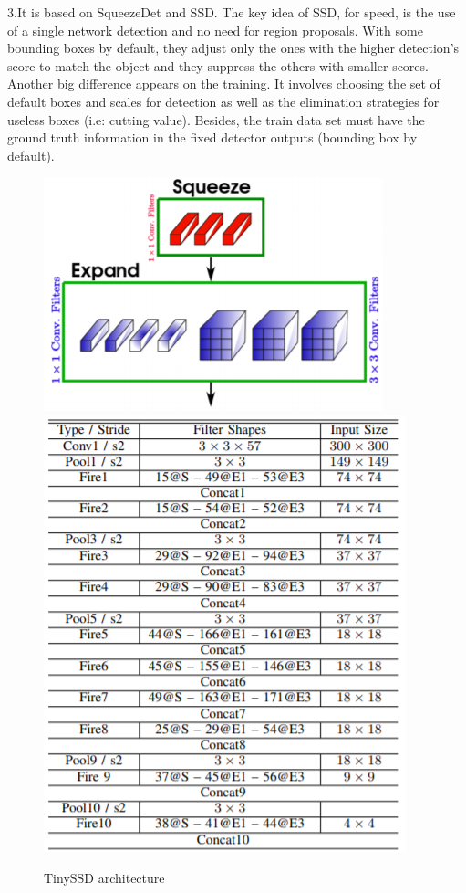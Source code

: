 \documentclass[10pt]{article}
\begin{document}
3.It is based on SqueezeDet and SSD. The key idea of SSD, for speed, is the use of a single network detection and no need for region proposals. With some bounding boxes by default, they adjust only the ones with the higher detection's score to match the object and they suppress the others with smaller scores. Another big difference appears on the training. It involves choosing the set of default boxes and scales for detection as well as the elimination strategies for useless boxes (i.e: cutting value). Besides, the train data set must have the ground truth information in the fixed detector outputs (bounding box by default).\\
\begin{figure}[H]
  	\centering
    \includegraphics[scale=0.7]{TinySSD.PNG}
    \includegraphics[scale=0.6]{tinySSDarchitecture.PNG}
    \caption{TinySSD architecture \cite{wong2018tiny}}
\end{figure} 
\end{document}
